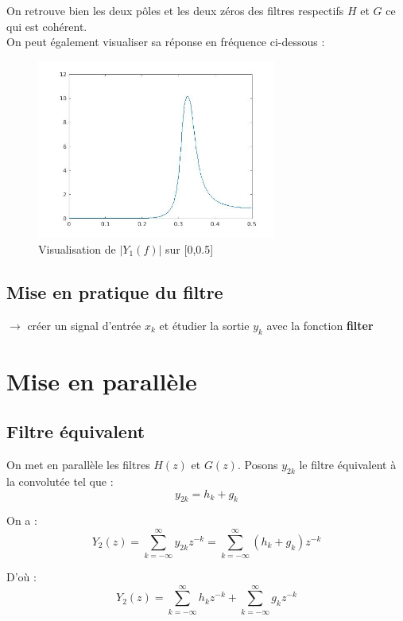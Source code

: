 \documentclass[12,french]{report}
\begin{document}
On retrouve bien les deux pôles et les deux zéros des filtres respectifs $H$ et $G$ ce qui est cohérent.\\

On peut également visualiser sa réponse en fréquence ci-dessous :

\begin{figure}[H]
	\center
	\includegraphics[width=0.7\textwidth]{./Images/freqz_Y1}
	\caption{Visualisation de $|Y_1(f)|$ sur [0,0.5]}
\end{figure}\vspace{0.2cm}


\section{Mise en pratique du filtre}

$\rightarrow$ créer un signal d'entrée $x_k$ et étudier la sortie $y_k$ avec la fonction \textbf{filter}



\chapter{Mise en parallèle}

\section{Filtre équivalent}

On met en parallèle les filtres $H(z)$ et $G(z)$. Posons $y_{2k}$ le filtre équivalent à la convolutée tel que : 
$$y_{2k}=h_k+g_k$$

On a :
$$ Y_2(z)=\sum_{k=-\infty}^{\infty}y_{2k}z^{-k}=\sum_{k=-\infty}^{\infty}(h_k+g_k)z^{-k} $$

D'où :
$$ Y_2(z)=\sum_{k=-\infty}^{\infty}h_kz^{-k}+\sum_{k=-\infty}^{\infty}g_kz^{-k} $$
\end{document}
